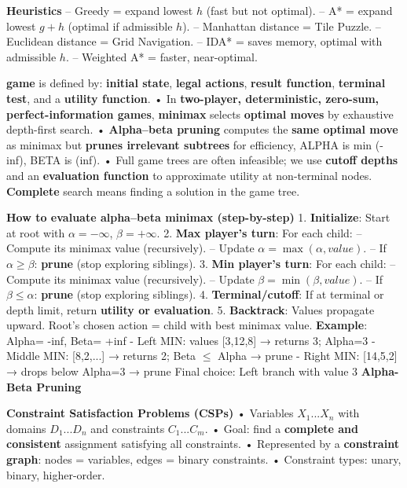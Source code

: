 ﻿\documentclass[10pt]{article}
\begin{document}
\begin{multicols*}{2}
\textbf{Heuristics}  
– Greedy = expand lowest $h$ (fast but not optimal).  
– A* = expand lowest $g+h$ (optimal if admissible $h$).  
– Manhattan distance = Tile Puzzle.  
– Euclidean distance = Grid Navigation.  
– IDA* = saves memory, optimal with admissible $h$.  
– Weighted A* = faster, near-optimal.  

\textbf{game} is defined by: \textbf{initial state}, \textbf{legal actions}, \textbf{result function}, \textbf{terminal test}, and a \textbf{utility function}.  
• In \textbf{two-player, deterministic, zero-sum, perfect-information games}, \textbf{minimax} selects \textbf{optimal moves} by exhaustive depth-first search.  
• \textbf{Alpha–beta pruning} computes the \textbf{same optimal move} as minimax but \textbf{prunes irrelevant subtrees} for efficiency, ALPHA is min (-inf), BETA is (inf).  
• Full game trees are often infeasible; we use \textbf{cutoff depths} and an \textbf{evaluation function} to approximate utility at non-terminal nodes. \textbf{Complete} search means finding a solution in the game tree. \textbf{} 

\textbf{How to evaluate alpha–beta minimax (step-by-step)}  
1. \textbf{Initialize}: Start at root with $\alpha=-\infty$, $\beta=+\infty$.  
2. \textbf{Max player’s turn}: For each child:  
   – Compute its minimax value (recursively).  
   – Update $\alpha = \max(\alpha, value)$.  
   – If $\alpha \geq \beta$: \textbf{prune} (stop exploring siblings).  
3. \textbf{Min player’s turn}: For each child:  
   – Compute its minimax value (recursively).  
   – Update $\beta = \min(\beta, value)$.  
   – If $\beta \leq \alpha$: \textbf{prune} (stop exploring siblings).  
4. \textbf{Terminal/cutoff}: If at terminal or depth limit, return \textbf{utility or evaluation}.  
5. \textbf{Backtrack}: Values propagate upward. Root’s chosen action = child with best minimax value.  
\textbf{Example}: Alpha= -inf, Beta= +inf
- Left MIN: values [3,12,8] → returns 3; Alpha=3
- Middle MIN: [8,2,...] → returns 2; Beta $\leq$ Alpha → prune
- Right MIN: [14,5,2] → drops below Alpha=3 → prune
Final choice: Left branch with value 3
\textbf{Alpha-Beta Pruning}

\textbf{Constraint Satisfaction Problems (CSPs)}  
• Variables $X_1...X_n$ with domains $D_1...D_n$ and constraints $C_1...C_m$.  
• Goal: find a \textbf{complete and consistent} assignment satisfying all constraints.  
• Represented by a \textbf{constraint graph}: nodes = variables, edges = binary constraints.  
• Constraint types: unary, binary, higher-order.  


\end{multicols*}
\end{document}
